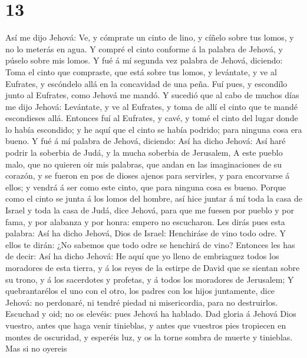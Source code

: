 \hypertarget{section-12}{%
\section{13}\label{section-12}}

 Así me dijo Jehová: Ve, y cómprate un cinto de lino, y
cíñelo sobre tus lomos, y no lo meterás en agua.  Y compré
el cinto conforme á la palabra de Jehová, y púselo sobre mis lomos.
 Y fué á mí segunda vez palabra de Jehová, diciendo:
 Toma el cinto que compraste, que está sobre tus lomos, y
levántate, y ve al Eufrates, y escóndelo allá en la concavidad de una
peña.  Fuí pues, y escondílo junto al Eufrates, como Jehová
me mandó.  Y sucedió que al cabo de muchos días me dijo
Jehová: Levántate, y ve al Eufrates, y toma de allí el cinto que te
mandé escondieses allá.  Entonces fuí al Eufrates, y cavé, y
tomé el cinto del lugar donde lo había escondido; y he aquí que el cinto
se había podrido; para ninguna cosa era bueno.  Y fué á mí
palabra de Jehová, diciendo:  Así ha dicho Jehová: Así haré
podrir la soberbia de Judá, y la mucha soberbia de Jerusalem,
 A este pueblo malo, que no quieren oir mis palabras, que
andan en las imaginaciones de su corazón, y se fueron en pos de dioses
ajenos para servirles, y para encorvarse á ellos; y vendrá á ser como
este cinto, que para ninguna cosa es bueno.  Porque como el
cinto se junta á los lomos del hombre, así hice juntar á mí toda la casa
de Israel y toda la casa de Judá, dice Jehová, para que me fuesen por
pueblo y por fama, y por alabanza y por honra: empero no escucharon.
 Les dirás pues esta palabra: Así ha dicho Jehová, Dios de
Israel: Henchiráse de vino todo odre. Y ellos te dirán: ¿No sabemos que
todo odre se henchirá de vino?  Entonces les has de decir:
Así ha dicho Jehová: He aquí que yo lleno de embriaguez todos los
moradores de esta tierra, y á los reyes de la estirpe de David que se
sientan sobre su trono, y á los sacerdotes y profetas, y á todos los
moradores de Jerusalem;  Y quebrantarélos el uno con el
otro, los padres con los hijos juntamente, dice Jehová: no perdonaré, ni
tendré piedad ni misericordia, para no destruirlos. 
Escuchad y oid; no os elevéis: pues Jehová ha hablado.  Dad
gloria á Jehová Dios vuestro, antes que haga venir tinieblas, y antes
que vuestros pies tropiecen en montes de oscuridad, y esperéis luz, y os
la torne sombra de muerte y tinieblas.  Mas si no oyereis
